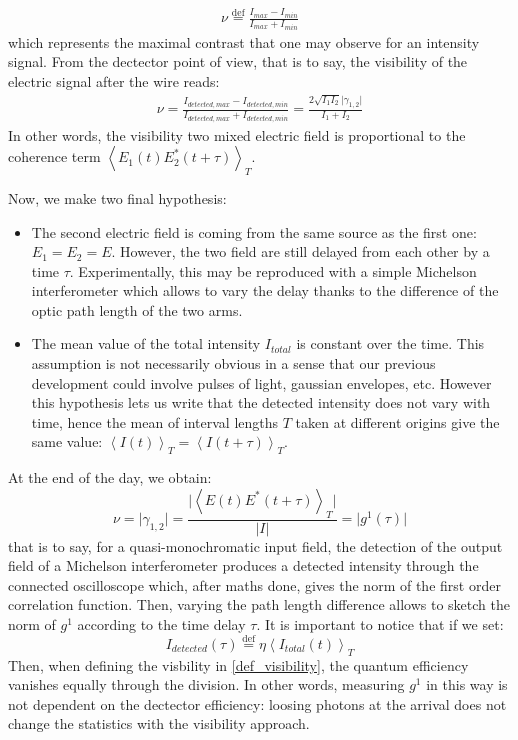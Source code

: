 \documentclass[10pt]{report}
\begin{document}
\begin{align}
\label{def_visibility}
\nu \stackrel{\text{def}}{=} \frac{I_{max} - I_{min}}{I_{max} + I_{min}}
\end{align}
which represents the maximal contrast that one may observe for an intensity signal. From the dectector point of view, that is to say, the visibility of the electric signal after the wire reads:
\begin{align}
\nu = \frac{I_{detected, max} - I_{detected, min}}{I_{detected, max} + I_{detected, min}} = \frac{2\sqrt{I_1 I_2} \vert \gamma_{1,2} \vert}{I_1 + I_2}
\end{align}
In other words, the visibility two mixed electric field is proportional to the coherence term $\left\langle E_1(t) E_2^*(t + \tau) \right\rangle _T$.

Now, we make two final hypothesis:
\begin{itemize}
	\item The second electric field is coming from the same source as the first one: $E_1 = E_2 = E$. However, the two field are still delayed from each other by a time $\tau$. Experimentally, this may be reproduced with a simple Michelson interferometer which allows to vary the delay thanks to the difference of the optic path length of the two arms.
	\item The mean value of the total intensity $I_{total}$ is constant over the time. This assumption is not necessarily obvious in a sense that our previous development could involve pulses of light, gaussian envelopes, etc. However this hypothesis lets us write that the detected intensity does not vary with time, hence the mean of interval lengths $T$ taken at  different origins give the same value: $\left\langle I(t) \right\rangle_T = \left\langle I(t + \tau) \right\rangle _T$.
\end{itemize}
At the end of the day, we obtain:
\begin{equation}
\nu = \vert \gamma_{1, 2} \vert = \frac{\vert\left\langle E(t) E^*(t + \tau) \right\rangle _T\vert}{\vert I \vert} = \vert g^1(\tau) \vert
\end{equation}
that is to say, for a quasi-monochromatic input field, the detection of the output field of a Michelson interferometer produces a detected intensity through the connected oscilloscope which, after maths done, gives the norm of the first order correlation function. Then, varying the path length difference allows to sketch the norm of $g^1$ according to the time delay $\tau$. It is important to notice that if we set:
\begin{equation}
I_{detected}(\tau) \stackrel{\text{def}}{=} \eta \left\langle I_{total}(t) \right\rangle_T
\end{equation}
Then, when defining the visbility in \eqref{def_visibility}, the quantum efficiency vanishes equally through the division. In other words, measuring $g^1$ in this way is not dependent on the dectector efficiency: loosing photons at the arrival does not change the statistics with the visibility approach.
\end{document}
